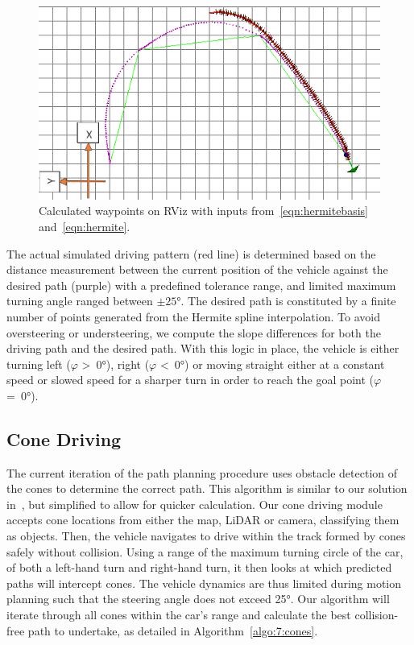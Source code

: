 
\begin{figure}[H]
	\centering
	\includegraphics[width=0.6\linewidth]{waypoint}
	\caption{Calculated waypoints on RViz with inputs from~\eqref{eqn:hermitebasis} and~\eqref{eqn:hermite}.}
	\label{fig:7:waypoint}
\end{figure}

The actual simulated driving pattern (red line) is determined based on the distance measurement between the current position of the vehicle against the desired path (purple) with a predefined tolerance range, and limited maximum turning angle ranged between $\pm\ang{25}$. The desired path is constituted by a finite number of points generated from the Hermite spline interpolation. To avoid oversteering or understeering, we compute the slope differences for both the driving path and the desired path.  With this logic in place, the vehicle is either turning left ($\varphi$ \textgreater\ \ang{0}), right ($\varphi$ \textless\ \ang{0}) or moving straight either at a constant speed or slowed speed for a sharper turn in order to reach the goal point ($\varphi$ =\ \ang{0}).

\subsection{Cone Driving}\label{sec:7:cone}
The current iteration of the path planning procedure uses obstacle detection of the cones to determine the correct path. This algorithm is similar to our solution in~\cite{lim_modular_2018}, but simplified to allow for quicker calculation. Our cone driving module accepts cone locations from either the map, LiDAR or camera, classifying them as objects. Then, the vehicle navigates to drive within the track formed by cones safely without collision. Using a range of the maximum turning circle of the car, of both a left-hand turn and right-hand turn, it then looks at which predicted paths will intercept cones. The vehicle dynamics are thus limited during motion planning such that the steering angle does not exceed \ang{25}. Our algorithm will iterate through all cones within the car's range and calculate the best collision-free path to undertake, as detailed in Algorithm~\ref{algo:7:cones}.

